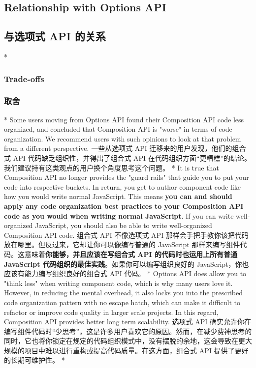 \begin{paracol}{2}
\subsection{Relationship with Options API}
\switchcolumn
\subsection{与选项式 API 的关系}
\switchcolumn[0]*%
\subsubsection{Trade-offs}
\switchcolumn
\subsubsection{取舍}
\switchcolumn[0]*%
Some users moving from Options API found their Composition API code less
organized, and concluded that Composition API is "worse" in terms of
code organization. We recommend users with such opinions to look at that
problem from a different perspective.
\switchcolumn
一些从选项式 API 迁移来的用户发现，他们的组合式 API
代码缺乏组织性，并得出了组合式 API
在代码组织方面``更糟糕''的结论。我们建议持有这类观点的用户换个角度思考这个问题。    
\switchcolumn[0]*%
It is true that Composition API no longer provides the "guard rails"
that guide you to put your code into respective buckets. In return, you
get to author component code like how you would write normal JavaScript.
This means \textbf{you can and should apply any code organization best
practices to your Composition API code as you would when writing normal
JavaScript}. If you can write well-organized JavaScript, you should also
be able to write well-organized Composition API code.
\switchcolumn
组合式 API 不像选项式 API
那样会手把手教你该把代码放在哪里。但反过来，它却让你可以像编写普通的
JavaScript
那样来编写组件代码。这意味着\textbf{你能够，并且应该在写组合式 API
的代码时也运用上所有普通 JavaScript
代码组织的最佳实践}。如果你可以编写组织良好的
JavaScript，你也应该有能力编写组织良好的组合式 API 代码。
\switchcolumn[0]*%
Options API does allow you to "think less" when writing component code,
which is why many users love it. However, in reducing the mental
overhead, it also locks you into the prescribed code organization
pattern with no escape hatch, which can make it difficult to refactor or
improve code quality in larger scale projects. In this regard,
Composition API provides better long term scalability.
\switchcolumn
选项式 API
确实允许你在编写组件代码时``少思考''，这是许多用户喜欢它的原因。然而，在减少费神思考的同时，它也将你锁定在规定的代码组织模式中，没有摆脱的余地，这会导致在更大规模的项目中难以进行重构或提高代码质量。在这方面，组合式
API 提供了更好的长期可维护性。
\switchcolumn[0]*%

\end{paracol}
